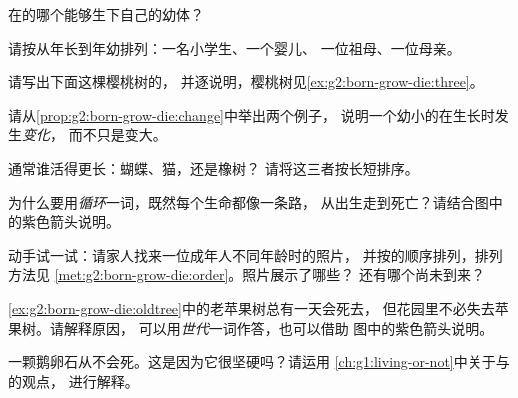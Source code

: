 \begin{exercise}[$\star$]\label{exo:g2:born-grow-die:2}
在的哪个能够生下自己的幼体？
\end{exercise}

\begin{exercise}[$\star$]\label{exo:g2:born-grow-die:3}
请按从年长到年幼排列：一名小学生、一个婴儿、
一位祖母、一位母亲。
\end{exercise}

\begin{exercise}[$\star$]\label{exo:g2:born-grow-die:4}
请写出下面这棵樱桃树的，
并逐说明，樱桃树见\cref{ex:g2:born-grow-die:three}。
\end{exercise}

\begin{exercise}[$\star$]\label{exo:g2:born-grow-die:5}
请从\cref{prop:g2:born-grow-die:change}中举出两个例子，
说明一个幼小的在生长时发生\emph{变化}，
而不只是变大。
\end{exercise}

\begin{exercise}[$\star$]\label{exo:g2:born-grow-die:6}
通常谁活得更长：蝴蝶、猫，还是橡树？
请将这三者按长短排序。
\end{exercise}

\begin{exercise}[$\star$]\label{exo:g2:born-grow-die:7}
为什么要用\emph{循环}一词，既然每个生命都像一条路，
从出生走到死亡？请结合图中的紫色箭头说明。
\end{exercise}

\begin{exercise}[$\star$]\label{exo:g2:born-grow-die:8}
动手试一试：请家人找来一位成年人不同年龄时的照片，
并按的顺序排列，排列方法见
\cref{met:g2:born-grow-die:order}。照片展示了哪些？
还有哪个尚未到来？
\end{exercise}

\begin{exercise}[$\star\star$]\label{exo:g2:born-grow-die:9}
\cref{ex:g2:born-grow-die:oldtree}中的老苹果树总有一天会死去，
但花园里不必失去苹果树。请解释原因，
可以用\emph{世代}一词作答，也可以借助
图中的紫色箭头说明。
\end{exercise}

\begin{exercise}[$\star\star$]\label{exo:g2:born-grow-die:10}
一颗鹅卵石从不会死。这是因为它很坚硬吗？请运用
\cref{ch:g1:living-or-not}中关于与的观点，
进行解释。
\end{exercise}
